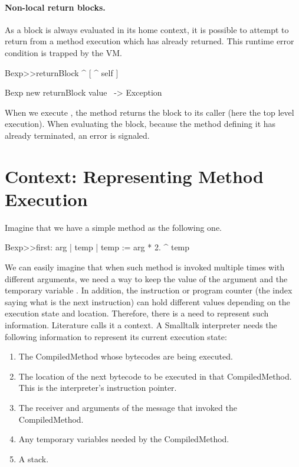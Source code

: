 \documentclass[a4paper,10pt,twoside]{book}
\begin{document}
\paragraph{Non-local return blocks.} As a block is always evaluated in its home context, it is possible to attempt to return from a method execution which has already returned. This runtime error condition is trapped by the VM.

\begin{code}{}
Bexp>>returnBlock
	^ [ ^ self ]

Bexp new returnBlock value ~-> Exception
\end{code}

When we execute , the method returns the block to its caller (here the top level execution). When evaluating the block, because the method defining it has already terminated, an error is signaled.


\section{Context: Representing Method Execution}
Imagine that we have a simple method as the following one.

\begin{code}{}
Bexp>>first: arg
	| temp |
	temp := arg * 2.
	^ temp
\end{code}

We can easily imagine that when such method is invoked multiple times with different arguments, we need a way to keep
the value of the argument  and the temporary variable . In addition, the instruction or program counter (the index saying what is the next instruction) can hold different values depending on the execution state and location. Therefore, there is a need to represent such information. Literature calls it a context. A Smalltalk interpreter needs the following information to represent its current execution state:
\begin{enumerate}
\item The CompiledMethod whose bytecodes are being executed.
\item The location of the next bytecode to be executed in that
CompiledMethod. This is the interpreter's instruction pointer.
\item The receiver and arguments of the message that invoked the
CompiledMethod.
\item Any temporary variables needed by the CompiledMethod.
\item A stack.
\end{enumerate}
\end{document}
